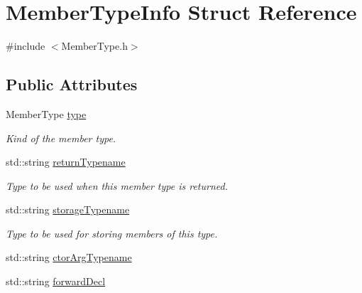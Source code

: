 \hypertarget{struct_member_type_info}{}\section{Member\+Type\+Info Struct Reference}
\label{struct_member_type_info}


{\ttfamily \#include $<$Member\+Type.\+h$>$}

\subsection*{Public Attributes}
\begin{DoxyCompactItemize}
\item 
\mbox{\label{struct_member_type_info_a10d452011495207f87d3f7732d581f64}} 
Member\+Type \hyperlink{struct_member_type_info_a10d452011495207f87d3f7732d581f64}{type}
\begin{DoxyCompactList}\small\item\em Kind of the member type. \end{DoxyCompactList}\item 
\mbox{\label{struct_member_type_info_a035ad654b11cfeef47b1ab5ac520d78c}} 
std\+::string \hyperlink{struct_member_type_info_a035ad654b11cfeef47b1ab5ac520d78c}{return\+Typename}
\begin{DoxyCompactList}\small\item\em Type to be used when this member type is returned. \end{DoxyCompactList}\item 
\mbox{\label{struct_member_type_info_a36a73b01f0698760ace0368ccf12e648}} 
std\+::string \hyperlink{struct_member_type_info_a36a73b01f0698760ace0368ccf12e648}{storage\+Typename}
\begin{DoxyCompactList}\small\item\em Type to be used for storing members of this type. \end{DoxyCompactList}\item 
std\+::string \hyperlink{struct_member_type_info_a9ffc1a49b5f4f42c42175ad77444176b}{ctor\+Arg\+Typename}
\item 
\mbox{\label{struct_member_type_info_a4755569393a961399d160ea48e9a1e23}} 
std\+::string \hyperlink{struct_member_type_info_a4755569393a961399d160ea48e9a1e23}{forward\+Decl}

\end{DoxyCompactItemize}

